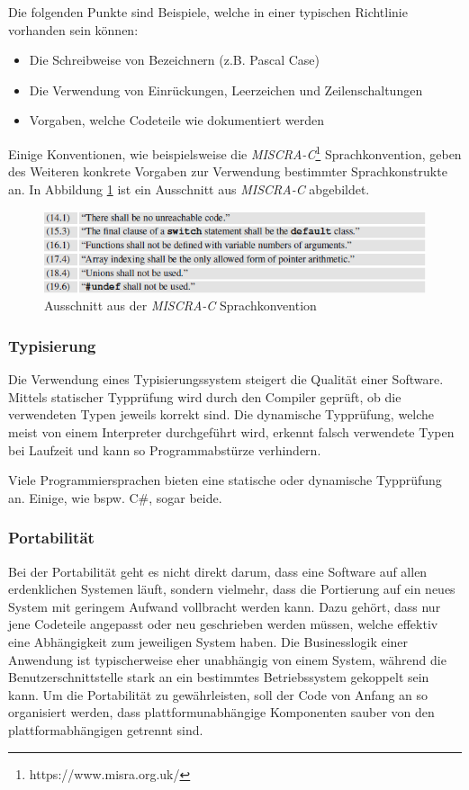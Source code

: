 Die folgenden Punkte sind Beispiele, welche in einer typischen Richtlinie vorhanden sein können:
\begin{itemize}
   \item Die Schreibweise von Bezeichnern (z.B. Pascal Case)
   \item Die Verwendung von Einrückungen, Leerzeichen und Zeilenschaltungen
   \item Vorgaben, welche Codeteile wie dokumentiert werden
\end{itemize}
Einige Konventionen, wie beispielsweise die \textit{MISCRA-C}\footnote{https://www.misra.org.uk/} Sprachkonvention, geben des Weiteren konkrete Vorgaben zur Verwendung bestimmter Sprachkonstrukte an.
In Abbildung \ref{fig:misra} ist ein Ausschnitt aus \textit{MISCRA-C} abgebildet.
\begin{figure}[H]
   \centering
   \includegraphics[width=1.0\textwidth]{gfx/misra.png}
   \caption{
      Ausschnitt aus der \textit{MISCRA-C} Sprachkonvention
   }
   \label{fig:misra}
\end{figure}


\subsubsection{Typisierung}\label{typing}
Die Verwendung eines Typisierungssystem steigert die Qualität einer Software.
Mittels statischer Typprüfung wird durch den Compiler geprüft, ob die verwendeten Typen jeweils korrekt sind.
Die dynamische Typprüfung, welche meist von einem Interpreter durchgeführt wird, erkennt falsch verwendete Typen bei Laufzeit und kann so Programmabstürze verhindern.

Viele Programmiersprachen bieten eine statische oder dynamische Typprüfung an.
Einige, wie bspw. C\#, sogar beide.

\subsubsection{Portabilität}\label{portability}
Bei der Portabilität geht es nicht direkt darum, dass eine Software auf allen erdenklichen Systemen läuft, sondern vielmehr, dass die Portierung auf ein neues System mit geringem Aufwand vollbracht werden kann.
Dazu gehört, dass nur jene Codeteile angepasst oder neu geschrieben werden müssen, welche effektiv eine Abhängigkeit zum jeweiligen System haben.
Die Businesslogik einer Anwendung ist typischerweise eher unabhängig von einem System, während die Benutzerschnittstelle stark an ein bestimmtes Betriebssystem gekoppelt sein kann.
Um die Portabilität zu gewährleisten, soll der Code von Anfang an so organisiert werden, dass plattformunabhängige Komponenten sauber von den plattformabhängigen getrennt sind.

